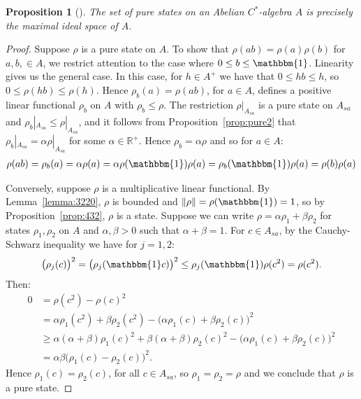 \documentclass[11pt,a4paper]{report}
\theoremstyle{plain}
\newtheorem{prop}{Proposition}
\theoremstyle{definition}
\newcommand{\1}{\mathbbm{1}}
\newcommand{\R}{\mathbb{R}}
\begin{document}
\begin{prop}[{\cite[4.4.1]{kadison83}}]\label{prop:puremult}
	The set of pure states on an Abelian $C^\ast$-algebra $A$ is precisely the 
	maximal ideal space of $A$.
\end{prop}
\begin{proof}
	Suppose $\rho$ is a pure state on $A$. To show that $\rho(ab)=\rho(a)\rho(b)$ 
	for $a,b,\in A$, we restrict attention to the case where $0\leq b\leq\1$. 
	Linearity gives us the general case. In this case, for $h\in A^+$ we have that 
	$0\leq hb\leq h$, so $0\leq\rho(hb)\leq\rho(h)$. Hence $\rho_b(a)=\rho(ab)$, for 
	$a\in A$, defines a positive linear functional $\rho_b$ on $A$ with 
	$\rho_b\leq\rho$. The restriction $\rho|_{A_{sa}}$ is a pure state on $A_{sa}$ 
	and $\rho_b|_{A_{sa}} \leq \rho|_{A_{sa}}$, and it follows from 
	Proposition~\ref{prop:pure2} that $\rho_b|_{A_{sa}} = \alpha \rho|_{A_{sa}}$ 
	for some $\alpha \in \R^+$. Hence $\rho_b = \alpha\rho$ and so for $a\in A$:
	\begin{align*}
		\rho(ab) = \rho_b(a) = \alpha\rho(a) = 
							\alpha\rho(\1)\rho(a) = \rho_b(\1)\rho(a) = \rho(b)\rho(a)
	\end{align*}
	
	Conversely, suppose $\rho$ is a multiplicative linear functional. By 
	Lemma~\ref{lemma:3220}, $\rho$ is bounded and $\left\|\rho\right\|=\rho(\1)=1$, 
	so by Proposition~\ref{prop:432}, $\rho$ is a state. Suppose we can write 
	$\rho=\alpha\rho_1+\beta\rho_2$ for states $\rho_1,\rho_2$ on $A$ and 
	$\alpha,\beta >0$ such that $\alpha+\beta=1$. For $c\in A_{sa}$, by the 
	Cauchy-Schwarz inequality we have for $j=1,2$:
	\begin{align*}
		\big(\rho_j(c)\big)^2 = \big(\rho_j(\1 c)\big)^2 
					\leq \rho_j(\1)\rho(c^2)=\rho(c^2).
	\end{align*}
	Then:
	\begin{align*}
				0
		&=		\rho(c^2)-\rho(c)^2 														\\
		&=		\alpha\rho_1(c^2)+\beta\rho_2(c^2) 
						- \big(\alpha\rho_1(c)+\beta\rho_2(c)\big)^2						\\
		&\geq	\alpha(\alpha+\beta)\rho_1(c)^2 
						+ \beta(\alpha+\beta)\rho_2(c)^2
						- \big(\alpha\rho_1(c)+\beta\rho_2(c)\big)^2						\\
		&=		\alpha\beta\big(\rho_1(c) - \rho_2(c)\big)^2.
	\end{align*}
	Hence $\rho_1(c)=\rho_2(c)$, for all $c\in A_{sa}$, so $\rho_1=\rho_2 =\rho$ and 
	we conclude that $\rho$ is a pure state.
\end{proof}
\end{document}
